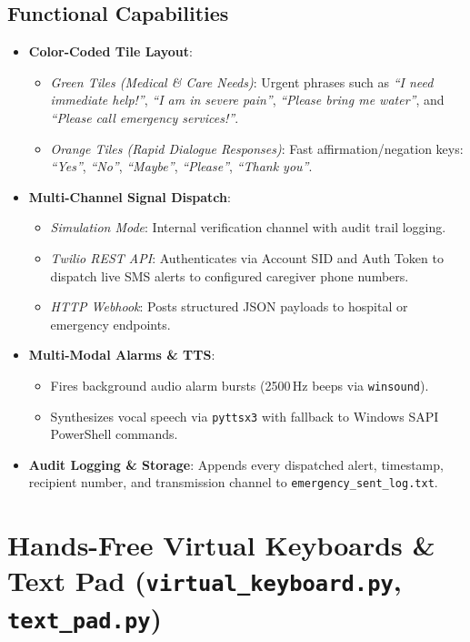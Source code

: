 \documentclass[11pt,a4paper]{article}
\begin{document}
\subsection{Functional Capabilities}
\begin{itemize}
    \item \textbf{Color-Coded Tile Layout}:
    \begin{itemize}
        \item \emph{Green Tiles (Medical \& Care Needs)}: Urgent phrases such as \emph{``I need immediate help!''}, \emph{``I am in severe pain''}, \emph{``Please bring me water''}, and \emph{``Please call emergency services!''}.
        \item \emph{Orange Tiles (Rapid Dialogue Responses)}: Fast affirmation/negation keys: \emph{``Yes''}, \emph{``No''}, \emph{``Maybe''}, \emph{``Please''}, \emph{``Thank you''}.
    \end{itemize}
    \item \textbf{Multi-Channel Signal Dispatch}:
    \begin{itemize}
        \item \emph{Simulation Mode}: Internal verification channel with audit trail logging.
        \item \emph{Twilio REST API}: Authenticates via Account SID and Auth Token to dispatch live SMS alerts to configured caregiver phone numbers.
        \item \emph{HTTP Webhook}: Posts structured JSON payloads to hospital or emergency endpoints.
    \end{itemize}
    \item \textbf{Multi-Modal Alarms \& TTS}:
    \begin{itemize}
        \item Fires background audio alarm bursts (2500\,Hz beeps via \texttt{winsound}).
        \item Synthesizes vocal speech via \texttt{pyttsx3} with fallback to Windows SAPI PowerShell commands.
    \end{itemize}
    \item \textbf{Audit Logging \& Storage}: Appends every dispatched alert, timestamp, recipient number, and transmission channel to \texttt{emergency\_sent\_log.txt}.
\end{itemize}

\section{Hands-Free Virtual Keyboards \& Text Pad (\texttt{virtual\_keyboard.py}, \texttt{text\_pad.py})}
\end{document}
